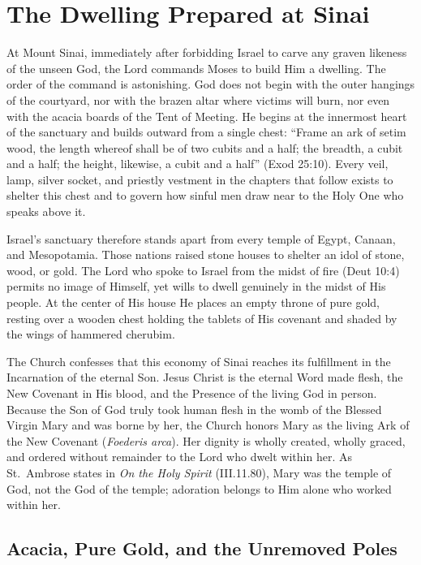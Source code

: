 \section{The Dwelling Prepared at Sinai}
\label{sec:dwelling-prepared}

At Mount Sinai, immediately after forbidding Israel to carve any graven likeness of the unseen God, the Lord commands Moses to build Him a dwelling. The order of the command is astonishing. God does not begin with the outer hangings of the courtyard, nor with the brazen altar where victims will burn, nor even with the acacia boards of the Tent of Meeting. He begins at the innermost heart of the sanctuary and builds outward from a single chest: ``Frame an ark of setim wood, the length whereof shall be of two cubits and a half; the breadth, a cubit and a half; the height, likewise, a cubit and a half'' (Exod 25:10). Every veil, lamp, silver socket, and priestly vestment in the chapters that follow exists to shelter this chest and to govern how sinful men draw near to the Holy One who speaks above it.

Israel's sanctuary therefore stands apart from every temple of Egypt, Canaan, and Mesopotamia. Those nations raised stone houses to shelter an idol of stone, wood, or gold. The Lord who spoke to Israel from the midst of fire (Deut 10:4) permits no image of Himself, yet wills to dwell genuinely in the midst of His people. At the center of His house He places an empty throne of pure gold, resting over a wooden chest holding the tablets of His covenant and shaded by the wings of hammered cherubim.

The Church confesses that this economy of Sinai reaches its fulfillment in the Incarnation of the eternal Son. Jesus Christ is the eternal Word made flesh, the New Covenant in His blood, and the Presence of the living God in person. Because the Son of God truly took human flesh in the womb of the Blessed Virgin Mary and was borne by her, the Church honors Mary as the living Ark of the New Covenant (\textit{Foederis arca}). Her dignity is wholly created, wholly graced, and ordered without remainder to the Lord who dwelt within her. As St.\ Ambrose states in \textit{On the Holy Spirit} (III.11.80), Mary was the temple of God, not the God of the temple; adoration belongs to Him alone who worked within her.

\subsection{Acacia, Pure Gold, and the Unremoved Poles}
\label{subsec:acacia-gold-poles}

